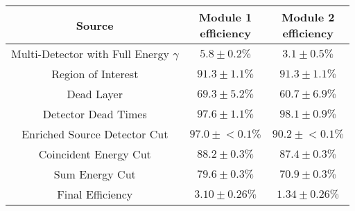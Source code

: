 \begin{tabular}{|c|c|c|}
\hline
  Source & \makecell{Module 1\\efficiency} & \makecell{Module 2\\efficiency} \\
\hline
  \makecell{Multi-Detector with\\Full Energy $\gamma$} & $5.8 \pm 0.2\%$ & $3.1 \pm 0.5\%$ \\
  Region of Interest & $91.3 \pm 1.1\%$ & $91.3 \pm 1.1\%$ \\
  Dead Layer & $69.3 \pm 5.2\%$ & $60.7 \pm 6.9\%$ \\
  Detector Dead Times & $97.6 \pm 1.1\%$ & $98.1 \pm 0.9\%$ \\
  Enriched Source Detector Cut & $97.0 \pm{}<\!0.1\%$ & $90.2 \pm{}<\!0.1\%$ \\
  Coincident Energy Cut & $88.2 \pm 0.3\%$ & $87.4 \pm 0.3\%$ \\
  Sum Energy Cut & $79.6 \pm 0.3\%$ & $70.9 \pm 0.3\%$ \\
  \hline Final Efficiency & $3.10 \pm 0.26\%$ & $1.34 \pm 0.26\%$ \\
\hline
\end{tabular}
